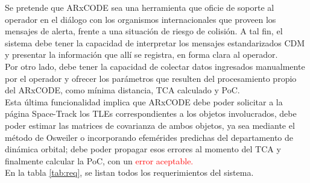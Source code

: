 Se pretende que ARxCODE sea una herramienta que oficie de soporte al operador en el di\'alogo con los organismos internacionales que proveen los mensajes de alerta, frente a una situaci\'on de riesgo de colisi\'on. A tal fin, el sistema debe tener la capacidad de interpretar los mensajes estandarizados CDM y presentar la informaci\'on que all\'i se registra, en forma clara al operador.\\
Por otro lado, debe tener la capacidad de colectar datos ingresados manualmente por el operador y ofrecer los par\'ametros que resulten del procesamiento propio del ARxCODE, como m\'inima distancia, TCA calculado y PoC.\\
Esta \'ultima funcionalidad implica que ARxCODE debe poder solicitar a la p\'agina Space-Track los TLEs correspondientes a los objetos involucrados, debe poder estimar las matrices de covarianza de ambos objetos, ya sea mediante el m\'etodo de Osweiler o incorporando efem\'erides predichas del departamento de din\'amica orbital; debe poder propagar esos errores al momento del TCA y finalmente calcular la PoC, con un \textcolor{red}{error aceptable.}\\
En la tabla \ref{tab:req}, se listan todos los requerimientos del sistema.\\

